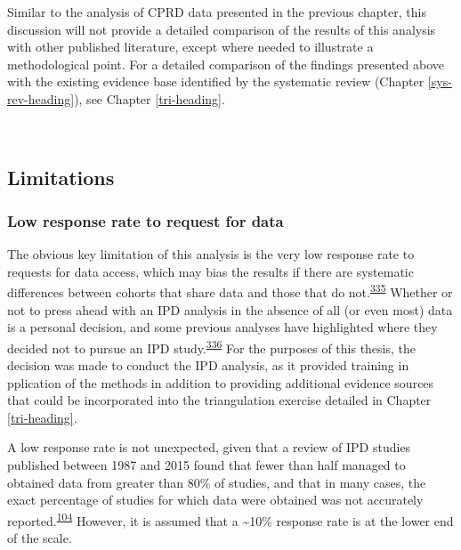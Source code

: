 \documentclass[a4paper, twoside]{templates/ociamthesis}
\begin{document}
Similar to the analysis of CPRD data presented in the previous chapter, this discussion will not provide a detailed comparison of the results of this analysis with other published literature, except where needed to illustrate a methodological point. For a detailed comparison of the findings presented above with the existing evidence base identified by the systematic review (Chapter \ref{sys-rev-heading}), see Chapter \ref{tri-heading}.

~

\hypertarget{limitations-1}{%
\subsection{Limitations}\label{limitations-1}}

\hypertarget{low-response-rate-to-request-for-data}{%
\subsubsection{Low response rate to request for data}\label{low-response-rate-to-request-for-data}}

The obvious key limitation of this analysis is the very low response rate to requests for data access, which may bias the results if there are systematic differences between cohorts that share data and those that do not.\textsuperscript{\protect\hyperlink{ref-ahmed2012}{335}} Whether or not to press ahead with an IPD analysis in the absence of all (or even most) data is a personal decision, and some previous analyses have highlighted where they decided not to pursue an IPD study.\textsuperscript{\protect\hyperlink{ref-jaspers2014}{336}} For the purposes of this thesis, the decision was made to conduct the IPD analysis, as it provided training in pplication of the methods in addition to providing additional evidence sources that could be incorporated into the triangulation exercise detailed in Chapter \ref{tri-heading}.

A low response rate is not unexpected, given that a review of IPD studies published between 1987 and 2015 found that fewer than half managed to obtained data from greater than 80\% of studies, and that in many cases, the exact percentage of studies for which data were obtained was not accurately reported.\textsuperscript{\protect\hyperlink{ref-nevitt2017}{104}} However, it is assumed that a \textasciitilde10\% response rate is at the lower end of the scale.
\end{document}
